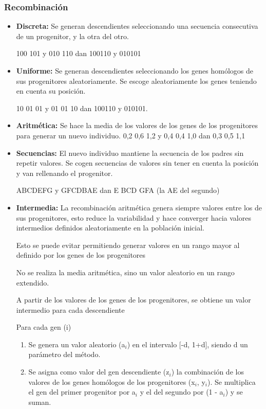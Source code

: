 \documentclass[12pt, twoside, openright]{report} %
\begin{document}
\subsubsection{Recombinación}
\begin{itemize}
	\item \textbf{Discreta:} Se generan descendientes seleccionando una secuencia consecutiva de un progenitor, y la otra del otro.
	      
	      100 101 y 010 110 dan 100110 y 010101
	\item \textbf{Uniforme:} Se generan descendientes seleccionando los genes homólogos de sus progenitores aleatoriamente. Se escoge aleatoriamente los genes teniendo en cuenta su posición.
	      
	      10 01 01 y 01 01 10 dan 100110 y 010101.
	\item \textbf{Aritmética:} Se hace la media de los valores de los genes de los progenitores para generar un nuevo individuo.
	      0,2 0,6 1,2 y 0,4 0,4 1,0 dan 0,3 0,5 1,1
	\item \textbf{Secuencias:} El nuevo individuo mantiene la secuencia de los padres sin repetir valores. Se cogen secuencias de valores sin tener en cuenta la posición y van rellenando el progenitor.
	      
	      ABCDEFG y GFCDBAE dan E BCD GFA (la AE del segundo)
	\item \textbf{Intermedia:} La recombinación aritmética genera siempre valores entre los de sus progenitores, esto reduce la variabilidad y hace converger hacia valores intermedios definidos aleatoriamente en la población inicial.
	      
	      Esto se puede evitar permitiendo generar valores en un rango mayor al definido por los genes de los progenitores
	      
	      No se realiza la media aritmética, sino un valor aleatorio en un rango extendido.
	      
	      A partir de los valores de los genes de los progenitores, se obtiene un valor intermedio para cada descendiente
	      \pagebreak
	      
	      Para cada gen (i)
	      \begin{enumerate}
		      \item Se genera un valor aleatorio (a$_i$) en el intervalo [-d, 1+d], siendo d un parámetro del método.
		      \item Se asigna como valor del gen descendiente (z$_i$) la combinación de los valores de los genes homólogos de los progenitores (x$_i$, y$_i$). Se multiplica el gen del primer progenitor por a$_i$ y el del segundo por (1 - a$_i$) y se suman.
	      \end{enumerate}
	      

\end{itemize}
\end{document}
